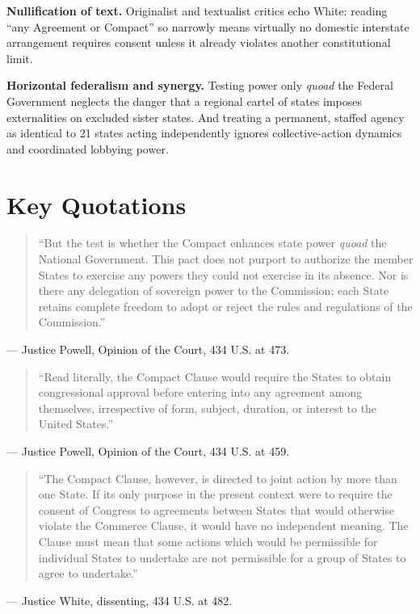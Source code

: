 \documentclass[12pt]{article}
\begin{document}
\textbf{Nullification of text.} Originalist and textualist critics echo White: reading ``any Agreement or Compact'' so narrowly means virtually no domestic interstate arrangement requires consent unless it already violates another constitutional limit.

\textbf{Horizontal federalism and synergy.} Testing power only \textit{quoad} the Federal Government neglects the danger that a regional cartel of states imposes externalities on excluded sister states. And treating a permanent, staffed agency as identical to 21 states acting independently ignores collective-action dynamics and coordinated lobbying power.

\section{Key Quotations}

\begin{quote}
``But the test is whether the Compact enhances state power \textit{quoad} the National Government. This pact does not purport to authorize the member States to exercise any powers they could not exercise in its absence. Nor is there any delegation of sovereign power to the Commission; each State retains complete freedom to adopt or reject the rules and regulations of the Commission.''
\end{quote}
\noindent --- Justice Powell, Opinion of the Court, 434 U.S. at 473.

\begin{quote}
``Read literally, the Compact Clause would require the States to obtain congressional approval before entering into any agreement among themselves, irrespective of form, subject, duration, or interest to the United States.''
\end{quote}
\noindent --- Justice Powell, Opinion of the Court, 434 U.S. at 459.

\begin{quote}
``The Compact Clause, however, is directed to joint action by more than one State. If its only purpose in the present context were to require the consent of Congress to agreements between States that would otherwise violate the Commerce Clause, it would have no independent meaning. The Clause must mean that some actions which would be permissible for individual States to undertake are not permissible for a group of States to agree to undertake.''
\end{quote}
\noindent --- Justice White, dissenting, 434 U.S. at 482.
\end{document}

